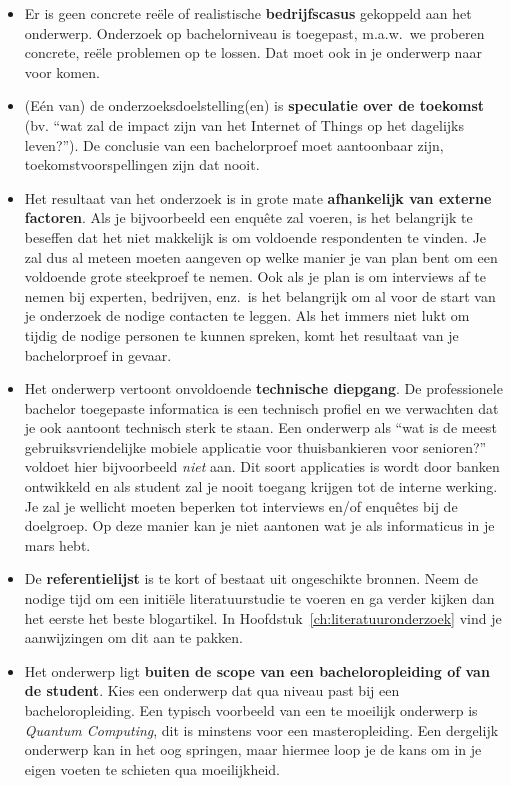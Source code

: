 \begin{itemize}
  \item Er is geen concrete reële of realistische \textbf{bedrijfscasus} gekoppeld aan het onderwerp. Onderzoek op bachelorniveau is toegepast, m.a.w.~we proberen concrete, reële problemen op te lossen. Dat moet ook in je onderwerp naar voor komen.
  \item (Eén van) de onderzoeksdoelstelling(en) is \textbf{speculatie over de toekomst} (bv. ``wat zal de impact zijn van het Internet of Things op het dagelijks leven?''). De conclusie van een bachelorproef moet aantoonbaar zijn, toekomstvoorspellingen zijn dat nooit.
  \item Het resultaat van het onderzoek is in grote mate \textbf{afhankelijk van externe factoren}. Als je bijvoorbeeld een enquête zal voeren, is het belangrijk te beseffen dat het niet makkelijk is om voldoende respondenten te vinden. Je zal dus al meteen moeten aangeven op welke manier je van plan bent om een voldoende grote steekproef te nemen. Ook als je plan is om interviews af te nemen bij experten, bedrijven, enz.\ is het belangrijk om al voor de start van je onderzoek de nodige contacten te leggen. Als het immers niet lukt om tijdig de nodige personen te kunnen spreken, komt het resultaat van je bachelorproef in gevaar.
  \item Het onderwerp vertoont onvoldoende \textbf{technische diepgang}. De professionele bachelor toegepaste informatica is een technisch profiel en we verwachten dat je ook aantoont technisch sterk te staan. Een onderwerp als ``wat is de meest gebruiksvriendelijke mobiele applicatie voor thuisbankieren voor senioren?'' voldoet hier bijvoorbeeld \textit{niet} aan. Dit soort applicaties is wordt door banken ontwikkeld en als student zal je nooit toegang krijgen tot de interne werking. Je zal je wellicht moeten beperken tot interviews en/of enquêtes bij de doelgroep. Op deze manier kan je niet aantonen wat je als informaticus in je mars hebt.
  \item De \textbf{referentielijst} is te kort of bestaat uit ongeschikte bronnen. Neem de nodige tijd om een initiële literatuurstudie te voeren en ga verder kijken dan het eerste het beste blogartikel. In Hoofdstuk~\ref{ch:literatuuronderzoek} vind je aanwijzingen om dit aan te pakken.
  \item Het onderwerp ligt \textbf{buiten de scope van een bacheloropleiding of van de student}. Kies een onderwerp dat qua niveau past bij een bacheloropleiding. Een typisch voorbeeld van een te moeilijk onderwerp is \textit{Quantum Computing}, dit is minstens voor een masteropleiding. Een dergelijk onderwerp kan in het oog springen, maar hiermee loop je de kans om in je eigen voeten te schieten qua moeilijkheid.
\end{itemize}

